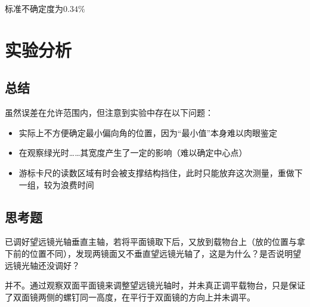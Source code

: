 \documentclass[a4paper]{ltxdoc}
\begin{document}
\begin{multicols}{2}
    标准不确定度为$0.34\%$


    \section{实验分析}


    \subsection{总结}
    虽然误差在允许范围内，但注意到实验中存在以下问题：
    \begin{itemize}
        \item 实际上不方便确定最小偏向角的位置，因为“最小值”本身难以肉眼鉴定
        \item 在观察绿光时……其宽度产生了一定的影响（难以确定中心点）
        \item 游标卡尺的读数区域有时会被支撑结构挡住，此时只能放弃这次测量，重做下一组，较为浪费时间
    \end{itemize}

    \subsection{思考题}

    已调好望远镜光轴垂直主轴，若将平面镜取下后，又放到载物台上（放的位置与拿下前的位置不同），发现两镜面又不垂直望远镜光轴了，这是为什么？是否说明望远镜光轴还没调好？

    并不。通过观察双面平面镜来调整望远镜光轴时，并未真正调平载物台，只是保证了双面镜两侧的螺钉同一高度，在平行于双面镜的方向上并未调平。
\end{multicols}
\end{document}
